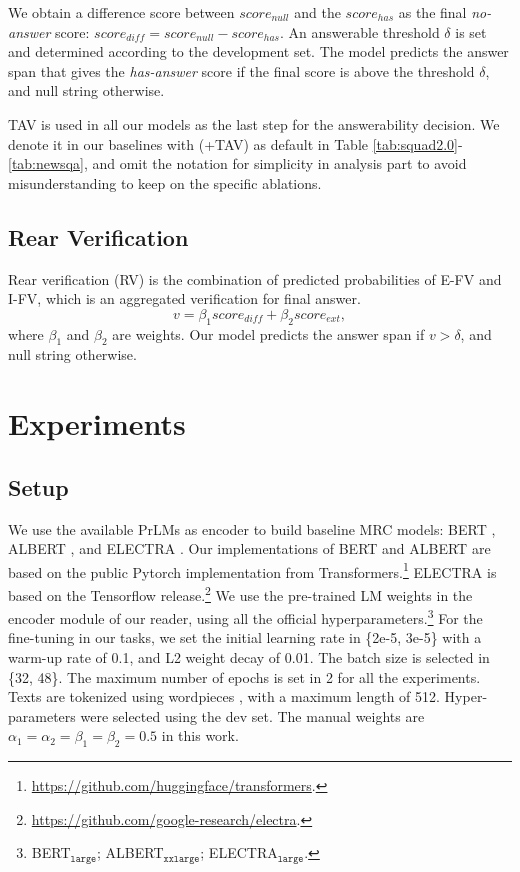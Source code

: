 \documentclass[letterpaper]{article} %
\begin{document}
We obtain a difference score between $score_{null}$ and the $score_{has}$ as the final \textit{no-answer} score: $score_{diff} = score_{null} - score_{has}$. An answerable threshold $\delta$ %
is set and determined %
according to the development set. The model predicts the answer span that gives the \textit{has-answer} score if the final score is above the threshold $\delta$, and null string otherwise.

TAV is used in all our models as the last step for the answerability  decision. We denote it in our baselines with (+TAV) as default in Table \ref{tab:squad2.0}-\ref{tab:newsqa}, and omit the notation for simplicity in analysis part to avoid misunderstanding to keep on the specific ablations.

\subsection{Rear Verification}
Rear verification (RV) is the combination of predicted probabilities of E-FV and I-FV, which is an aggregated verification for final answer. %
\begin{equation}
v = \beta_{1} score_{diff} + \beta_{2} score_{ext},
\end{equation}
where $\beta_{1}$ and $\beta_{2}$ are weights. Our model predicts the answer span if $v > \delta$, and null string otherwise.

\section{Experiments}
\subsection{Setup}
We use %
the available PrLMs as encoder to build baseline MRC models: BERT \cite{devlin2018bert}, ALBERT \cite{Lan2020ALBERT}, and ELECTRA \cite{clark2019electra}. Our implementations of BERT and ALBERT are based on the public Pytorch implementation from Transformers.\footnote{\url{https://github.com/huggingface/transformers}.} ELECTRA is based on the Tensorflow release.\footnote{\url{https://github.com/google-research/electra}.} We use the pre-trained LM weights in the encoder module of our reader, using all the official hyperparameters.\footnote{BERT$_\texttt{large}$; ALBERT$_\texttt{xxlarge}$; ELECTRA$_\texttt{large}$.} For the fine-tuning in our tasks, we set the initial learning rate in \{2e-5, 3e-5\} with a warm-up rate of 0.1, and L2 weight decay of 0.01. The batch size is selected in \{32, 48\}. The maximum number of epochs is set in 2 for all the experiments. Texts are tokenized using wordpieces \cite{wu2016google}, with a maximum length of 512. Hyper-parameters were selected using the dev set. The manual weights are  $\alpha_{1}=\alpha_{2}=\beta_{1}=\beta_{2}=0.5$ in this work.
\end{document}
